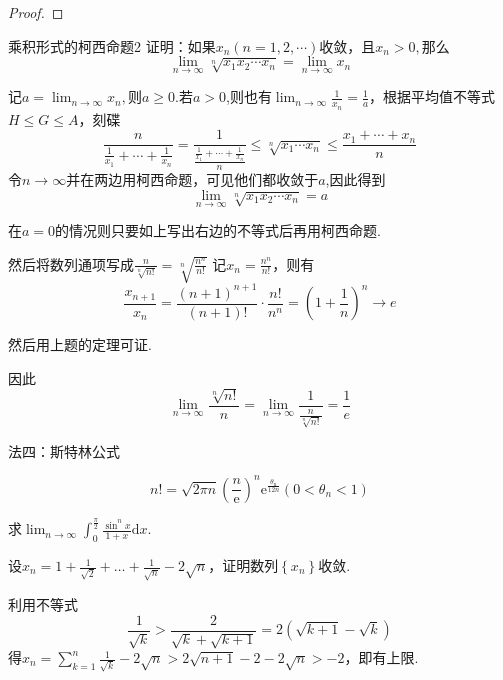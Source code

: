 \begin{xiti}
\begin{solution}
\begin{enumerate}
\begin{proof}
				\end{proof}
		\begin{theorem}{乘积形式的柯西命题}{2}
			证明：如果$x_n(n=1,2,\cdots )$收敛，且$x_n>0,$那么
			$$ 
			\lim _{n \rightarrow \infty} \sqrt[n]{x_{1} x_{2} \cdots x_{n}}=\lim _{n \rightarrow \infty} x_{n}
			$$
		\end{theorem}
			\begin{solution}
			记$a=\lim_{n \rightarrow \infty}x_n,$则$a\geq 0$.若$a> 0$,则也有$\lim_{n \rightarrow \infty}\frac{1}{x_n}
			=\frac{1}{a}$，根据平均值不等式$H\leq G\leq A$，刻碟
			\[\frac{n}{\frac{1}{x_{1}}+\cdots+\frac{1}{x_{n}}}=\frac{1}{\frac{\frac{1}{x_{1}}+\cdots+\frac{1}{x_{n}}}{n}} \leqslant \sqrt[n]{x_{1} \cdots x_{n}} \leqslant \frac{x_{1}+\cdots+x_{n}}{n}\]
			令$n\rightarrow \infty$并在两边用柯西命题，可见他们都收敛于$a$,因此得到
			$$ 
			\lim _{n \rightarrow \infty} \sqrt[n]{x_{1} x_{2} \cdots x_{n}}=a
			$$
			
			在$a=0$的情况则只要如上写出右边的不等式后再用柯西命题.
		\end{solution}
	然后将数列通项写成$\frac{n}{\sqrt[n]{n !}}=\sqrt[n]{\frac{n^{n}}{n !}}$
	记$x_n=\frac{n^n}{n!}$，则有
	\[\frac{x_{n+1}}{x_{n}}=\frac{(n+1)^{n+1}}{(n+1) !} \cdot \frac{n !}{n^{n}}=\left(1+\frac{1}{n}\right)^{n} \rightarrow e\]
	
	然后用上题的定理可证.
	
	\begin{note}
		因此
		$$\lim_{n \rightarrow \infty}\frac{\sqrt[n]{n!}}{n}=
		\lim_{n \rightarrow \infty}\frac{1}{\frac{n}{\sqrt[n]{n!}}}=\frac{1}{e}$$
		
	\end{note}
	
	法四：斯特林公式
	
	\[n !=\sqrt{2 \pi n}\left(\frac{n}{\mathrm{e}}\right)^{n} \mathrm{e}^{\frac{\theta_{\mathrm{n}}}{12 n}}\left(0<\theta_{n}<1\right)\]	
	\end{enumerate}
\end{solution}
\item 求$\lim _ { n \rightarrow \infty } \int _ { 0 } ^ { \frac { \pi } { 2 } } \frac { \sin ^ { n } x } { 1 + x } \mathrm { d } x$.
\item 设$x _ { n } = 1 + \frac { 1 } { \sqrt { 2 } } + \dots + \frac { 1 } { \sqrt { n } } - 2 \sqrt { n }$，证明数列$\left\lbrace x_{n}\right\rbrace $收敛.
\begin{solution}
利用不等式
\[
\frac{1}{\sqrt{k}}>\frac{2}{\sqrt{k}+\sqrt{k+1}}=2(\sqrt{k+1}-\sqrt{k})
\]
得$x_{n}=\sum_{k=1}^{n} \frac{1}{\sqrt{k}}-2 \sqrt{n}>2 \sqrt{n+1}-2-2 \sqrt{n}>-2$，即有上限.


\end{solution}
\end{xiti}
